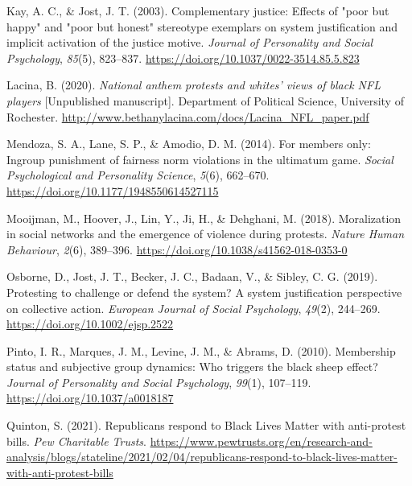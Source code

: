 \documentclass[twocolumn, 11pt, letterpaper]{article}
\newenvironment{CSLReferences}[2]{}{}
\begin{document}
\begin{CSLReferences}{1}{0}
\leavevmode{}%
Kay, A. C., \& Jost, J. T. (2003). Complementary justice: Effects of
"poor but happy" and "poor but honest" stereotype exemplars on system
justification and implicit activation of the justice motive.
\emph{Journal of Personality and Social Psychology}, \emph{85}(5),
823--837. \url{https://doi.org/10.1037/0022-3514.85.5.823}

\leavevmode{}%
Lacina, B. (2020). \emph{National anthem protests and whites' views of
black NFL players} {[}Unpublished manuscript{]}. Department of Political
Science, University of Rochester.
\url{http://www.bethanylacina.com/docs/Lacina_NFL_paper.pdf}

\leavevmode{}%
Mendoza, S. A., Lane, S. P., \& Amodio, D. M. (2014). For members only:
Ingroup punishment of fairness norm violations in the ultimatum game.
\emph{Social Psychological and Personality Science}, \emph{5}(6),
662--670. \url{https://doi.org/10.1177/1948550614527115}

\leavevmode{}%
Mooijman, M., Hoover, J., Lin, Y., Ji, H., \& Dehghani, M. (2018).
Moralization in social networks and the emergence of violence during
protests. \emph{Nature Human Behaviour}, \emph{2}(6), 389--396.
\url{https://doi.org/10.1038/s41562-018-0353-0}

\leavevmode{}%
Osborne, D., Jost, J. T., Becker, J. C., Badaan, V., \& Sibley, C. G.
(2019). Protesting to challenge or defend the system? {A} system
justification perspective on collective action. \emph{European Journal
of Social Psychology}, \emph{49}(2), 244--269.
\url{https://doi.org/10.1002/ejsp.2522}

\leavevmode{}%
Pinto, I. R., Marques, J. M., Levine, J. M., \& Abrams, D. (2010).
Membership status and subjective group dynamics: Who triggers the black
sheep effect? \emph{Journal of Personality and Social Psychology},
\emph{99}(1), 107--119. \url{https://doi.org/10.1037/a0018187}

\leavevmode{}%
Quinton, S. (2021). Republicans respond to {Black Lives Matter} with
anti-protest bills. \emph{Pew Charitable Trusts}.
\url{https://www.pewtrusts.org/en/research-and-analysis/blogs/stateline/2021/02/04/republicans-respond-to-black-lives-matter-with-anti-protest-bills}


\end{CSLReferences}
\end{document}
